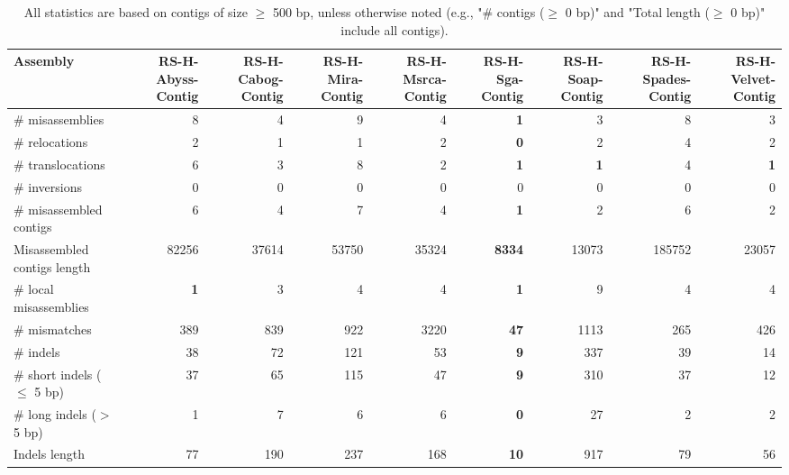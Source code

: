 \documentclass[12pt,a4paper]{article}
\begin{document}
\begin{table}[ht]
\begin{center}
\caption{All statistics are based on contigs of size $\geq$ 500 bp, unless otherwise noted (e.g., "\# contigs ($\geq$ 0 bp)" and "Total length ($\geq$ 0 bp)" include all contigs).}
\begin{tabular}{|l*{8}{|r}|}
\hline
Assembly & RS-H-Abyss-Contig & RS-H-Cabog-Contig & RS-H-Mira-Contig & RS-H-Msrca-Contig & RS-H-Sga-Contig & RS-H-Soap-Contig & RS-H-Spades-Contig & RS-H-Velvet-Contig \\ \hline
\# misassemblies & 8 & 4 & 9 & 4 & {\bf 1} & 3 & 8 & 3 \\ \hline
\hspace{5mm}\# relocations & 2 & 1 & 1 & 2 & {\bf 0} & 2 & 4 & 2 \\ \hline
\hspace{5mm}\# translocations & 6 & 3 & 8 & 2 & {\bf 1} & {\bf 1} & 4 & {\bf 1} \\ \hline
\hspace{5mm}\# inversions & 0 & 0 & 0 & 0 & 0 & 0 & 0 & 0 \\ \hline
\# misassembled contigs & 6 & 4 & 7 & 4 & {\bf 1} & 2 & 6 & 2 \\ \hline
Misassembled contigs length & 82256 & 37614 & 53750 & 35324 & {\bf 8334} & 13073 & 185752 & 23057 \\ \hline
\# local misassemblies & {\bf 1} & 3 & 4 & 4 & {\bf 1} & 9 & 4 & 4 \\ \hline
\# mismatches & 389 & 839 & 922 & 3220 & {\bf 47} & 1113 & 265 & 426 \\ \hline
\# indels & 38 & 72 & 121 & 53 & {\bf 9} & 337 & 39 & 14 \\ \hline
\hspace{5mm}\# short indels ($\leq$ 5 bp) & 37 & 65 & 115 & 47 & {\bf 9} & 310 & 37 & 12 \\ \hline
\hspace{5mm}\# long indels ($>$ 5 bp) & 1 & 7 & 6 & 6 & {\bf 0} & 27 & 2 & 2 \\ \hline
Indels length & 77 & 190 & 237 & 168 & {\bf 10} & 917 & 79 & 56 \\ \hline
\end{tabular}
\end{center}
\end{table}
\end{document}
